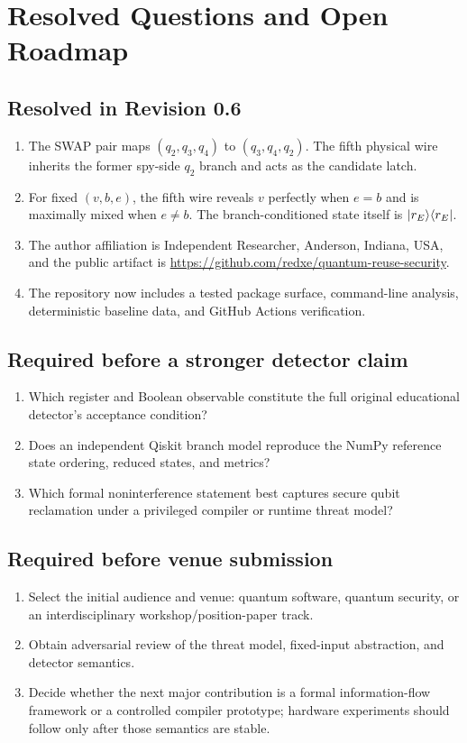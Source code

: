 \section{Resolved Questions and Open Roadmap}
\label{app:questions}

\subsection{Resolved in Revision 0.6}

\begin{enumerate}
  \item The SWAP pair maps $(q_2,q_3,q_4)$ to $(q_3,q_4,q_2)$. The fifth
  physical wire inherits the former spy-side $q_2$ branch and acts as the
  candidate latch.
  \item For fixed $(v,b,e)$, the fifth wire reveals $v$ perfectly when $e=b$
  and is maximally mixed when $e\neq b$. The branch-conditioned state itself is
  $\ket{r_E}\!\bra{r_E}$.
  \item The author affiliation is Independent Researcher, Anderson, Indiana,
  USA, and the public artifact is
  \url{https://github.com/redxe/quantum-reuse-security}.
  \item The repository now includes a tested package surface, command-line
  analysis, deterministic baseline data, and GitHub Actions verification.
\end{enumerate}

\subsection{Required before a stronger detector claim}

\begin{enumerate}
  \item Which register and Boolean observable constitute the full original
  educational detector's acceptance condition?
  \item Does an independent Qiskit branch model reproduce the NumPy reference
  state ordering, reduced states, and metrics?
  \item Which formal noninterference statement best captures secure qubit
  reclamation under a privileged compiler or runtime threat model?
\end{enumerate}

\subsection{Required before venue submission}

\begin{enumerate}
  \item Select the initial audience and venue: quantum software, quantum
  security, or an interdisciplinary workshop/position-paper track.
  \item Obtain adversarial review of the threat model, fixed-input abstraction,
  and detector semantics.
  \item Decide whether the next major contribution is a formal information-flow
  framework or a controlled compiler prototype; hardware experiments should
  follow only after those semantics are stable.
\end{enumerate}
